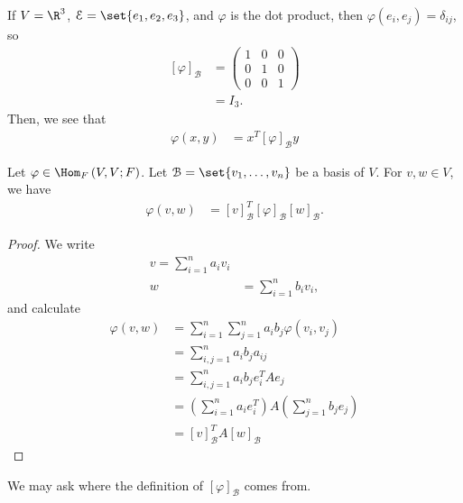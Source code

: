 \documentclass[10pt]{mypackage}
\begin{document}
  \begin{example}
    If $V = \R^3$, $\mathcal{E} = \set{e_1,e_2,e_3}$, and $\varphi$ is the dot product, then $\varphi\left(e_i,e_j\right) = \delta_{ij}$, so
    \begin{align*}
      \left[\varphi\right]_{\mathcal{B}} &= \begin{pmatrix}1 & 0 & 0 \\ 0 & 1 & 0 \\ 0 & 0 & 1\end{pmatrix}\\
                                         &= I_3.
    \end{align*}
    Then, we see that
    \begin{align*}
      \varphi\left(x,y\right) &= x^{T}\left[\varphi\right]_{\mathcal{B}}y
    \end{align*}
  \end{example}
  \begin{theorem}
    Let $\varphi\in \Hom_{F}\left(V,V;F\right)$. Let $\mathcal{B} = \set{v_1,\dots,v_n}$ be a basis of $V$. For $v,w\in V$, we have
    \begin{align*}
      \varphi\left(v,w\right) &= \left[v\right]_{\mathcal{B}}^{T}\left[\varphi\right]_{\mathcal{B}}\left[w\right]_{\mathcal{B}}.
    \end{align*}
  \end{theorem}
  \begin{proof}
    We write
    \begin{align*}
      v = \sum_{i=1}^{n}a_iv_i\\
      w &= \sum_{i=1}^{n}b_iv_i,
    \end{align*}
    and calculate
    \begin{align*}
      \varphi\left(v,w\right) &= \sum_{i=1}^{n}\sum_{j=1}^{n}a_ib_j\varphi\left(v_i,v_j\right)\\
                              &= \sum_{i,j=1}^{n}a_ib_ja_{ij}\\
                              &= \sum_{i,j=1}^{n} a_{i}b_{j}e_{i}^{T}Ae_{j}\\
                              &= \left(\sum_{i=1}^{n}a_ie_i^{T}\right)A\left(\sum_{j=1}^{n}b_je_j\right)\\
                              &= \left[v\right]_{\mathcal{B}}^{T} A \left[w\right]_{\mathcal{B}}
    \end{align*}
    
  \end{proof}
  We may ask where the definition of $\left[\varphi\right]_{\mathcal{B}}$ comes from.\newline
\end{document}
